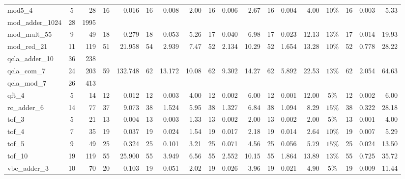 \begin{table}[htbp]
\begin{tabular}{l c r | r r | r r r | r r r | r r r | c r r r}
mod5_4 & 5 & 28 & \cellcolor{bestT}16 & 0.016 & \cellcolor{bestT}16 & 0.008 & 2.00 & \cellcolor{bestT}16 & 0.006 & 2.67 & \cellcolor{bestT}16 & 0.004 & 4.00 & $10\%$ & \cellcolor{bestT}16 & \cellcolor{bestTime}0.003 & 5.33 \\
mod_adder_1024 & 28 & 1995 &  &  &  &  &  &  &  &  &  &  &  &  &  &  &  \\
mod_mult_55 & 9 & 49 & 18 & 0.279 & 18 & 0.053 & 5.26 & \cellcolor{bestT}17 & 0.040 & 6.98 & \cellcolor{bestT}17 & 0.023 & 12.13 & $13\%$ & \cellcolor{bestT}17 & \cellcolor{bestTime}0.014 & 19.93 \\
mod_red_21 & 11 & 119 & \cellcolor{bestT}51 & 21.958 & 54 & 2.939 & 7.47 & 52 & 2.134 & 10.29 & 52 & 1.654 & 13.28 & $10\%$ & 52 & \cellcolor{bestTime}0.778 & 28.22 \\
qcla_adder_10 & 36 & 238 &  &  &  &  &  &  &  &  &  &  &  &  &  &  &  \\
qcla_com_7 & 24 & 203 & \cellcolor{bestT}59 & 132.748 & 62 & 13.172 & 10.08 & 62 & 9.302 & 14.27 & 62 & 5.892 & 22.53 & $13\%$ & 62 & \cellcolor{bestTime}2.054 & 64.63 \\
qcla_mod_7 & 26 & 413 &  &  &  &  &  &  &  &  &  &  &  &  &  &  &  \\
qft_4 & 5 & 14 & \cellcolor{bestT}12 & 0.012 & \cellcolor{bestT}12 & 0.003 & 4.00 & \cellcolor{bestT}12 & 0.002 & 6.00 & \cellcolor{bestT}12 & \cellcolor{bestTime}0.001 & 12.00 & $5\%$ & \cellcolor{bestT}12 & 0.002 & 6.00 \\
rc_adder_6 & 14 & 77 & \cellcolor{bestT}37 & 9.073 & 38 & 1.524 & 5.95 & 38 & 1.327 & 6.84 & 38 & 1.094 & 8.29 & $15\%$ & 38 & \cellcolor{bestTime}0.322 & 28.18 \\
tof_3 & 5 & 21 & \cellcolor{bestT}13 & 0.004 & \cellcolor{bestT}13 & 0.003 & 1.33 & \cellcolor{bestT}13 & 0.002 & 2.00 & \cellcolor{bestT}13 & 0.002 & 2.00 & $5\%$ & \cellcolor{bestT}13 & \cellcolor{bestTime}0.001 & 4.00 \\
tof_4 & 7 & 35 & \cellcolor{bestT}19 & 0.037 & \cellcolor{bestT}19 & 0.024 & 1.54 & \cellcolor{bestT}19 & 0.017 & 2.18 & \cellcolor{bestT}19 & 0.014 & 2.64 & $10\%$ & \cellcolor{bestT}19 & \cellcolor{bestTime}0.007 & 5.29 \\
tof_5 & 9 & 49 & \cellcolor{bestT}25 & 0.324 & \cellcolor{bestT}25 & 0.101 & 3.21 & \cellcolor{bestT}25 & 0.071 & 4.56 & \cellcolor{bestT}25 & 0.056 & 5.79 & $15\%$ & \cellcolor{bestT}25 & \cellcolor{bestTime}0.024 & 13.50 \\
tof_10 & 19 & 119 & \cellcolor{bestT}55 & 25.900 & \cellcolor{bestT}55 & 3.949 & 6.56 & \cellcolor{bestT}55 & 2.552 & 10.15 & \cellcolor{bestT}55 & 1.864 & 13.89 & $13\%$ & \cellcolor{bestT}55 & \cellcolor{bestTime}0.725 & 35.72 \\
vbe_adder_3 & 10 & 70 & 20 & 0.103 & \cellcolor{bestT}19 & 0.051 & 2.02 & \cellcolor{bestT}19 & 0.026 & 3.96 & \cellcolor{bestT}19 & 0.021 & 4.90 & $5\%$ & \cellcolor{bestT}19 & \cellcolor{bestTime}0.009 & 11.44 \\
\bottomrule
\end{tabular}
\end{table}
